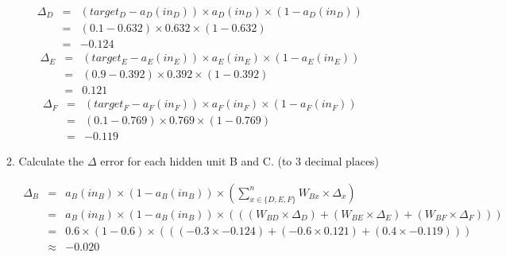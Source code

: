 \documentclass[--SOLUTION-OPTION--]{ditpaper}
\begin{document}
\begin{enumerate}
\begin{enumerate}
		\begin{answer}
		\begin{eqnarray*}
		\Delta_D& = &(target_D - a_D(in_D)) \times a_D(in_D) \times (1-a_D(in_D))\\
		& = &(0.1-0.632) \times 0.632 \times (1-0.632)\\
		& = &-0.124
		\end{eqnarray*}
		\begin{eqnarray*}
		\Delta_E& = &(target_E - a_E(in_E)) \times a_E(in_E) \times (1-a_E(in_E))\\
		& = &(0.9-0.392) \times 0.392 \times (1-0.392)\\
		& = &0.121
		\end{eqnarray*}
		\begin{eqnarray*}
		\Delta_F& = &(target_F - a_F(in_F)) \times a_F(in_F) \times (1-a_F(in_F))\\
		& = &(0.1-0.769) \times 0.769 \times (1-0.769)\\
		& = &-0.119
		\end{eqnarray*}
		\end{answer}
	\item Calculate the \textbf{$\Delta$} error for each hidden unit B and C. (to 3 decimal places)
		\begin{answer}
\begin{eqnarray*}
\Delta_B &=& a_B(in_B) \times (1-a_B(in_B)) \times \left( \sum_{x \in \{D,E,F\}}^{n}W_{Bx} \times \Delta_x \right)\\
&=& a_B(in_B) \times (1-a_B(in_B)) \times \left(((W_{BD} \times \Delta_D)+(W_{BE} \times \Delta_E)+(W_{BF} \times \Delta_F))\right)\\
&=& 0.6 \times (1-0.6) \times \left(((-0.3 \times -0.124)+(-0.6 \times 0.121)+(0.4 \times -0.119))\right)\\
&\approx& -0.020\\
\end{eqnarray*}


\end{answer}
\end{enumerate}
\end{enumerate}
\end{document}
